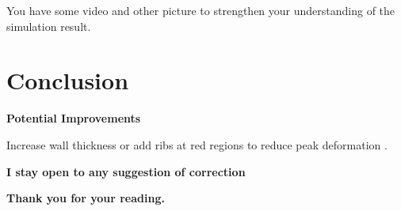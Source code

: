 \documentclass[11pt,a4paper]{article}
\begin{document}
	You have some video and other picture to strengthen your understanding of the simulation result.
	
	
	
	\section{Conclusion}
	
	\textbf{Potential Improvements}
	
	Increase wall thickness or add ribs at red regions to reduce peak deformation . 
	
	
	
	\textbf{I stay open to any suggestion of correction}
	
	\vspace{1cm}
	\begin{center}
		\textcolor[RGB]{34,139,34}{\textbf{Thank you for your reading.}}
	\end{center}
	
	
	
\end{document}
